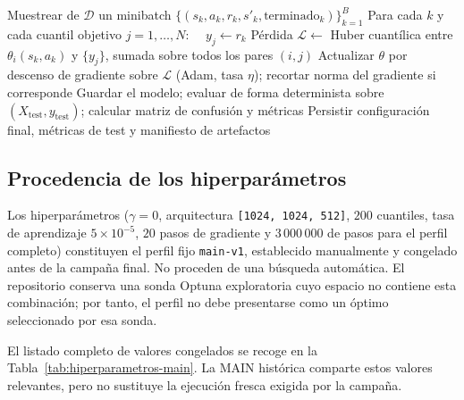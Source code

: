 \begin{algorithm}[htbp]
\begin{algorithmic}[1]
    \EndIf
            \State Muestrear de $\mathcal{D}$ un minibatch $\{(s_k, a_k, r_k, s'_k, \text{terminado}_k)\}_{k=1}^{B}$
            \State Para cada $k$ y cada cuantil objetivo $j=1,\dots,N$: $\quad y_j \leftarrow r_k$ 
            \State Pérdida $\mathcal{L} \leftarrow$ Huber cuantílica entre $\theta_i(s_k,a_k)$ y $\{y_j\}$, sumada sobre todos los pares $(i,j)$
            \State Actualizar $\theta$ por descenso de gradiente sobre $\mathcal{L}$ (Adam, tasa $\eta$); recortar norma del gradiente si corresponde
        \EndFor
    \EndIf
\EndWhile
\State Guardar el modelo; evaluar de forma determinista sobre $(X_{\text{test}}, y_{\text{test}})$; calcular matriz de confusión y métricas
\State Persistir configuración final, métricas de test y manifiesto de artefactos
\end{algorithmic}
\end{algorithm}

\subsection{Procedencia de los hiperparámetros}
Los hiperparámetros ($\gamma = 0$, arquitectura \texttt{[1024, 1024, 512]}, $200$ cuantiles, tasa de aprendizaje $5\times10^{-5}$, $20$ pasos de gradiente y $3\,000\,000$ de pasos para el perfil completo) constituyen el perfil fijo \texttt{main-v1}, establecido manualmente y congelado antes de la campaña final. No proceden de una búsqueda automática. El repositorio conserva una sonda Optuna exploratoria cuyo espacio no contiene esta combinación; por tanto, el perfil no debe presentarse como un óptimo seleccionado por esa sonda.

El listado completo de valores congelados se recoge en la Tabla~\ref{tab:hiperparametros-main}. La MAIN histórica comparte estos valores relevantes, pero no sustituye la ejecución fresca exigida por la campaña.

